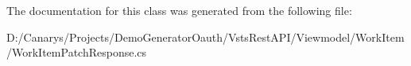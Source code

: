The documentation for this class was generated from the following file\+:\begin{DoxyCompactItemize}
\item 
D\+:/\+Canarys/\+Projects/\+Demo\+Generator\+Oauth/\+Vsts\+Rest\+A\+P\+I/\+Viewmodel/\+Work\+Item/Work\+Item\+Patch\+Response.\+cs\end{DoxyCompactItemize}
